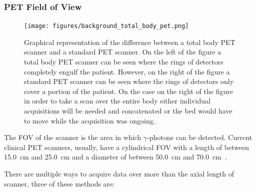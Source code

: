             \subsubsection{PET Field of View} \label{sec:pet_field_of_view}
                \begin{figure}
                    \centering
                    
                    \texttt{[image: figures/background\_total\_body\_pet.png]}
                    
                    \captionsetup{singlelinecheck=false, justification=raggedright}
                    \caption{Graphical representation of the difference between a total body \gls{PET} scanner and a standard \gls{PET} scanner. On the left of the figure a total body \gls{PET} scanner can be seen where the rings of detectors completely engulf the patient. However, on the right of the figure a standard \gls{PET} scanner can be seen where the rings of detectors only cover a portion of the patient. On the case on the right of the figure in order to take a scan over the entire body either individual acquisitions will be needed and concatenated or the bed would have to move while the acquisition was ongoing.} \label{fig:pet_fov_total_body_pet}
                \end{figure}
                
                The \gls{FOV} of the scanner is the area in which $\gamma$-photons can be detected. Current clinical \gls{PET} scanners, usually, have a cylindrical \gls{FOV} with a length of between \SI{15.0}{\centi\metre} and \SI{25.0}{\centi\metre} and a diameter of between \SI{50.0}{\centi\metre} and \SI{70.0}{\centi\metre}~.
                
                There are multiple ways to acquire data over more than the axial length of scanner, three of these methods are:
                
